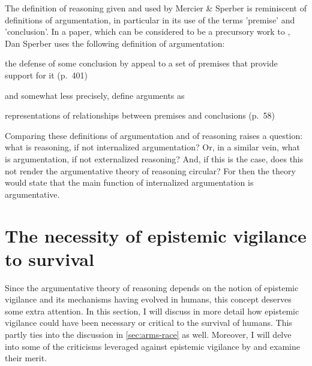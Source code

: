 The definition of reasoning given and used by Mercier \& Sperber is reminiscent of definitions of argumentation, in particular in its use of the terms 'premise' and 'conclusion'. In a \citeyear{Sperber01} paper, which can be considered to be a precursory work to \citet{MS11}, Dan Sperber uses the following definition of argumentation:
\begin{quoting}
    the defense of some conclusion by appeal to a set of premises that provide support for it
    \hfill (p.~401)
\end{quoting}
and somewhat less precisely, \citet{MS11} define arguments as
\begin{quoting}
    representations of relationships between premises and conclusions
    \hfill (p.~58)
\end{quoting}

Comparing these definitions of argumentation and of reasoning raises a question: what is reasoning, if not internalized argumentation? Or, in a similar vein, what is argumentation, if not externalized reasoning? And, if this is the case, does this not render the argumentative theory of reasoning circular? For then the theory would state that the main function of internalized argumentation is argumentative.

\section{The necessity of epistemic vigilance to survival}
\label{sec:epi-vigil-crit}

Since the argumentative theory of reasoning depends on the notion of epistemic vigilance and its mechanisms having evolved in humans, this concept deserves some extra attention.
In this section, I will discuss in more detail how epistemic vigilance could have been necessary or critical to the survival of humans. This partly ties into the discussion in \cref{sec:arms-race} as well.
Moreover, I will delve into some of the criticisms leveraged against epistemic vigilance by \citet{Michaelian13} and examine their merit.

